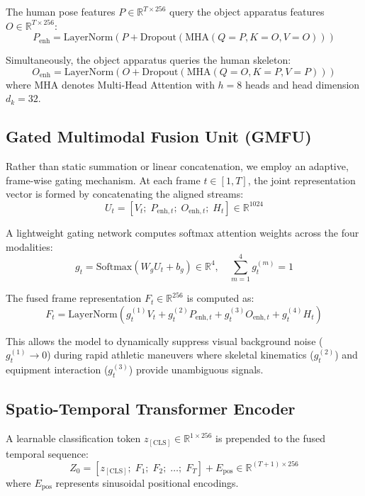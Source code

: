 \documentclass[10pt,journal,compsoc]{IEEEtran}
\begin{document}
The human pose features $P \in \mathbb{R}^{T \times 256}$ query the object apparatus features $O \in \mathbb{R}^{T \times 256}$:
\begin{equation}
P_{\text{enh}} = \text{LayerNorm}\left(P + \text{Dropout}\left(\text{MHA}(Q=P, K=O, V=O)\right)\right)
\end{equation}

Simultaneously, the object apparatus queries the human skeleton:
\begin{equation}
O_{\text{enh}} = \text{LayerNorm}\left(O + \text{Dropout}\left(\text{MHA}(Q=O, K=P, V=P)\right)\right)
\end{equation}
where $\text{MHA}$ denotes Multi-Head Attention with $h=8$ heads and head dimension $d_k = 32$.

\subsection{Gated Multimodal Fusion Unit (GMFU)}
Rather than static summation or linear concatenation, we employ an adaptive, frame-wise gating mechanism. At each frame $t \in [1, T]$, the joint representation vector is formed by concatenating the aligned streams:
\begin{equation}
U_t = [V_t; \; P_{\text{enh}, t}; \; O_{\text{enh}, t}; \; H_t] \in \mathbb{R}^{1024}
\end{equation}

A lightweight gating network computes softmax attention weights across the four modalities:
\begin{equation}
g_t = \text{Softmax}\left(W_g U_t + b_g\right) \in \mathbb{R}^4, \quad \sum_{m=1}^{4} g_t^{(m)} = 1
\end{equation}

The fused frame representation $F_t \in \mathbb{R}^{256}$ is computed as:
\begin{equation}
F_t = \text{LayerNorm}\left(g_t^{(1)} V_t + g_t^{(2)} P_{\text{enh}, t} + g_t^{(3)} O_{\text{enh}, t} + g_t^{(4)} H_t\right)
\end{equation}

This allows the model to dynamically suppress visual background noise ($g_t^{(1)} \to 0$) during rapid athletic maneuvers where skeletal kinematics ($g_t^{(2)}$) and equipment interaction ($g_t^{(3)}$) provide unambiguous signals.

\subsection{Spatio-Temporal Transformer Encoder}
A learnable classification token $z_{[\text{CLS}]} \in \mathbb{R}^{1 \times 256}$ is prepended to the fused temporal sequence:
\begin{equation}
Z_0 = [z_{[\text{CLS}]}; \; F_1; \; F_2; \; \dots; \; F_T] + E_{\text{pos}} \in \mathbb{R}^{(T+1) \times 256}
\end{equation}
where $E_{\text{pos}}$ represents sinusoidal positional encodings. 
\end{document}
